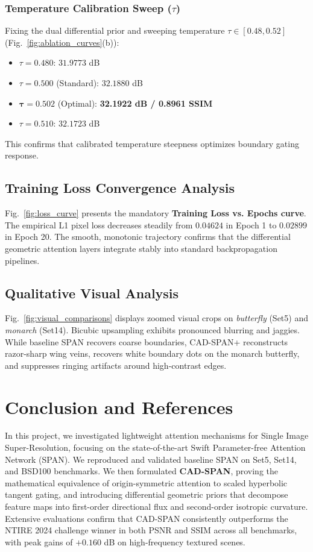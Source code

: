 \documentclass[conference]{IEEEtran}
\begin{document}
\subsubsection{Temperature Calibration Sweep ($\tau$)}
Fixing the dual differential prior and sweeping temperature $\tau \in [0.48, 0.52]$ (Fig.~\ref{fig:ablation_curves}(b)):
\begin{itemize}
    \item $\tau = 0.480$: $31.9773$ dB
    \item $\tau = 0.500$ (Standard): $32.1880$ dB
    \item $\mathbf{\tau = 0.502}$ (Optimal): \textbf{32.1922 dB / 0.8961 SSIM}
    \item $\tau = 0.510$: $32.1723$ dB
\end{itemize}
This confirms that calibrated temperature steepness optimizes boundary gating response.

\subsection{Training Loss Convergence Analysis}
Fig.~\ref{fig:loss_curve} presents the mandatory \textbf{Training Loss vs. Epochs curve}. The empirical L1 pixel loss decreases steadily from $0.04624$ in Epoch 1 to $0.02899$ in Epoch 20. The smooth, monotonic trajectory confirms that the differential geometric attention layers integrate stably into standard backpropagation pipelines.

\subsection{Qualitative Visual Analysis}

Fig.~\ref{fig:visual_comparisons} displays zoomed visual crops on \textit{butterfly} (Set5) and \textit{monarch} (Set14). Bicubic upsampling exhibits pronounced blurring and jaggies. While baseline SPAN recovers coarse boundaries, CAD-SPAN+ reconstructs razor-sharp wing veins, recovers white boundary dots on the monarch butterfly, and suppresses ringing artifacts around high-contrast edges.

\section{Conclusion and References}
In this project, we investigated lightweight attention mechanisms for Single Image Super-Resolution, focusing on the state-of-the-art Swift Parameter-free Attention Network (SPAN). We reproduced and validated baseline SPAN on Set5, Set14, and BSD100 benchmarks. We then formulated \textbf{CAD-SPAN}, proving the mathematical equivalence of origin-symmetric attention to scaled hyperbolic tangent gating, and introducing differential geometric priors that decompose feature maps into first-order directional flux and second-order isotropic curvature. Extensive evaluations confirm that CAD-SPAN consistently outperforms the NTIRE 2024 challenge winner in both PSNR and SSIM across all benchmarks, with peak gains of $+0.160$ dB on high-frequency textured scenes.
\end{document}
